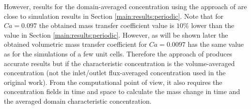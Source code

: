 \documentclass[preprint,12pt]{elsarticle}
\begin{document}
However, results for the domain-averaged concentration using the approach of \citeauthor{vanbaten-circular} are close to simulation results in Section
\ref{main:results:periodic}. %
Note that for $Ca=0.097$ the obtained mass transfer coefficient value is $10\%$ 
lower than the value in Section \ref{main:results:periodic}. However, as will
be shown later the obtained volumetric mass transfer coefficient for
$Ca=0.0097$ has the same value as for the simulations of a few unit cells.
Therefore the approach of \citet{vanbaten-circular} produces  accurate results but if the characteristic concentration is the volume-averaged concentration (not the inlet/outlet flux-averaged concentration used in the original work). From the computational point of view, it also requires the concentration fields in time and space to calculate the mass change in time and the averaged domain
characteristic concentration.
\end{document}
